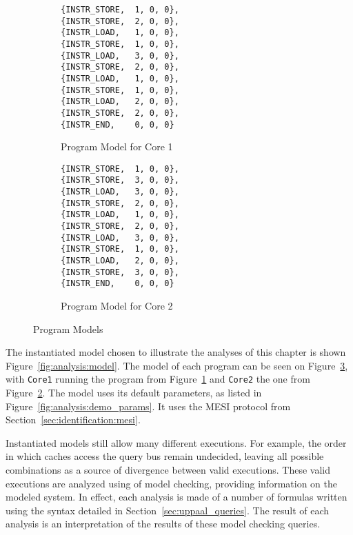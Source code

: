 \begin{figure}[hbt!]
\begin{center}
\begin{subfigure}[t]{0.35\textwidth}
\centering
\begin{lstlisting}
{INSTR_STORE,  1, 0, 0},
{INSTR_STORE,  2, 0, 0},
{INSTR_LOAD,   1, 0, 0},
{INSTR_STORE,  1, 0, 0},
{INSTR_LOAD,   3, 0, 0},
{INSTR_STORE,  2, 0, 0},
{INSTR_LOAD,   1, 0, 0},
{INSTR_STORE,  1, 0, 0},
{INSTR_LOAD,   2, 0, 0},
{INSTR_STORE,  2, 0, 0},
{INSTR_END,    0, 0, 0}
\end{lstlisting}
\caption{Program Model for Core 1}
\label{fig:analysis:demo_prog1}
\end{subfigure}
\begin{subfigure}[t]{0.35\textwidth}
\centering
\begin{lstlisting}
{INSTR_STORE,  1, 0, 0},
{INSTR_STORE,  3, 0, 0},
{INSTR_LOAD,   3, 0, 0},
{INSTR_STORE,  2, 0, 0},
{INSTR_LOAD,   1, 0, 0},
{INSTR_STORE,  2, 0, 0},
{INSTR_LOAD,   3, 0, 0},
{INSTR_STORE,  1, 0, 0},
{INSTR_LOAD,   2, 0, 0},
{INSTR_STORE,  3, 0, 0},
{INSTR_END,    0, 0, 0}
\end{lstlisting}
\caption{Program Model for Core 2}
\label{fig:analysis:demo_prog2}
\end{subfigure}
\end{center}
\caption{Program Models}
\label{fig:analysis:demo_progs}
\end{figure}

The instantiated model chosen to illustrate the analyses of this chapter is
shown Figure~\ref{fig:analysis:model}. The model of each program can
be seen on Figure~\ref{fig:analysis:demo_progs}, with \lstinline!Core1! running
the program from Figure~\ref{fig:analysis:demo_prog1} and \lstinline!Core2! the
one from Figure~\ref{fig:analysis:demo_prog2}. The model uses its default
parameters, as listed in Figure~\ref{fig:analysis:demo_params}. It uses the
MESI protocol from Section~\ref{sec:identification:mesi}.

Instantiated models still allow many different executions. For example, the
order in which caches access the query bus remain undecided, leaving all
possible combinations as a source of divergence between valid executions. These
valid executions are analyzed using of model checking, providing information on
the modeled system. In effect, each analysis is made of a number of formulas
written using the syntax detailed in Section~\ref{sec:uppaal_queries}. The
result of each analysis is an interpretation of the results of these model
checking queries.


